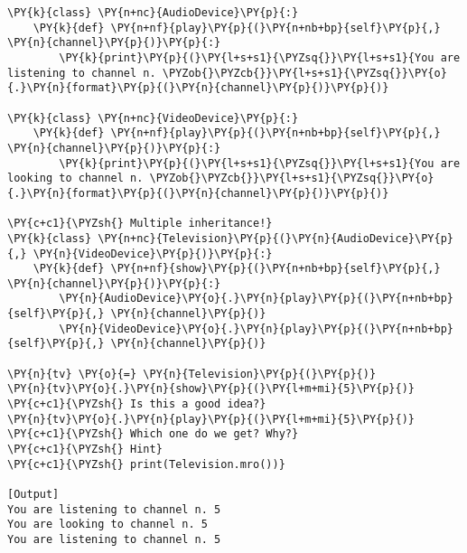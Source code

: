 \begin{Verbatim}[label=\makebox{\url{https://github.com/lucabaldini/cmepda/tree/master/slides/latex/snippets/multiple\_inheritance.py}},commandchars=\\\{\}]
\PY{k}{class} \PY{n+nc}{AudioDevice}\PY{p}{:}
    \PY{k}{def} \PY{n+nf}{play}\PY{p}{(}\PY{n+nb+bp}{self}\PY{p}{,} \PY{n}{channel}\PY{p}{)}\PY{p}{:}
        \PY{k}{print}\PY{p}{(}\PY{l+s+s1}{\PYZsq{}}\PY{l+s+s1}{You are listening to channel n. \PYZob{}\PYZcb{}}\PY{l+s+s1}{\PYZsq{}}\PY{o}{.}\PY{n}{format}\PY{p}{(}\PY{n}{channel}\PY{p}{)}\PY{p}{)}

\PY{k}{class} \PY{n+nc}{VideoDevice}\PY{p}{:}
    \PY{k}{def} \PY{n+nf}{play}\PY{p}{(}\PY{n+nb+bp}{self}\PY{p}{,} \PY{n}{channel}\PY{p}{)}\PY{p}{:}
        \PY{k}{print}\PY{p}{(}\PY{l+s+s1}{\PYZsq{}}\PY{l+s+s1}{You are looking to channel n. \PYZob{}\PYZcb{}}\PY{l+s+s1}{\PYZsq{}}\PY{o}{.}\PY{n}{format}\PY{p}{(}\PY{n}{channel}\PY{p}{)}\PY{p}{)}

\PY{c+c1}{\PYZsh{} Multiple inheritance!}
\PY{k}{class} \PY{n+nc}{Television}\PY{p}{(}\PY{n}{AudioDevice}\PY{p}{,} \PY{n}{VideoDevice}\PY{p}{)}\PY{p}{:}
    \PY{k}{def} \PY{n+nf}{show}\PY{p}{(}\PY{n+nb+bp}{self}\PY{p}{,} \PY{n}{channel}\PY{p}{)}\PY{p}{:}
        \PY{n}{AudioDevice}\PY{o}{.}\PY{n}{play}\PY{p}{(}\PY{n+nb+bp}{self}\PY{p}{,} \PY{n}{channel}\PY{p}{)}
        \PY{n}{VideoDevice}\PY{o}{.}\PY{n}{play}\PY{p}{(}\PY{n+nb+bp}{self}\PY{p}{,} \PY{n}{channel}\PY{p}{)}
    
\PY{n}{tv} \PY{o}{=} \PY{n}{Television}\PY{p}{(}\PY{p}{)}
\PY{n}{tv}\PY{o}{.}\PY{n}{show}\PY{p}{(}\PY{l+m+mi}{5}\PY{p}{)}
\PY{c+c1}{\PYZsh{} Is this a good idea?}
\PY{n}{tv}\PY{o}{.}\PY{n}{play}\PY{p}{(}\PY{l+m+mi}{5}\PY{p}{)} \PY{c+c1}{\PYZsh{} Which one do we get? Why?}
\PY{c+c1}{\PYZsh{} Hint}
\PY{c+c1}{\PYZsh{} print(Television.mro())}

[Output]
You are listening to channel n. 5
You are looking to channel n. 5
You are listening to channel n. 5
\end{Verbatim}